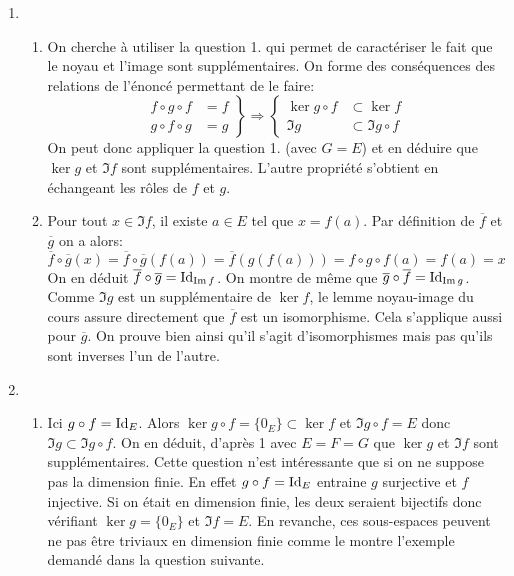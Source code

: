 \begin{enumerate}
 \item
\begin{enumerate}
 \item On cherche à utiliser la question 1. qui permet de caractériser le fait que le noyau et l'image sont supplémentaires. On forme des conséquences des relations de l'énoncé permettant de le faire:
\begin{displaymath}
 \left. 
\begin{aligned}
 f\circ g \circ f &= f \\ g\circ f \circ g &= g 
\end{aligned}
\right\rbrace 
\Rightarrow
\left\lbrace 
\begin{aligned}
 \ker g\circ f &\subset \ker f \\ \Im g &\subset \Im g\circ f
\end{aligned}
\right. 
\end{displaymath}
On peut donc appliquer la question 1. (avec $G=E$) et en déduire que $\ker g$ et $\Im f$ sont supplémentaires.\newline
L'autre propriété s'obtient en échangeant les rôles de $f$ et $g$.
 \item Pour tout $x\in \Im f$, il existe $a\in E$ tel que $x=f(a)$. Par définition de $\overline{f}$ et $\overline{g}$ on a alors:
\begin{displaymath}
 \overline{f}\circ\overline{g}(x) = \overline{f}\circ\overline{g}(f(a))
= \overline{f}(g(f(a))) = f\circ g \circ f (a) = f(a)=x
\end{displaymath}
On en déduit $\overline{f}\circ\overline{g} =\operatorname{Id}_{\operatorname{Im} f}$. On montre de même que $\overline{g}\circ\overline{f} =\operatorname{Id}_{\operatorname{Im} g}$.\newline
Comme $\Im g$ est un supplémentaire de $\ker f$, le lemme noyau-image du cours assure directement que $\overline{f}$ est un isomorphisme. Cela s'applique aussi pour $\overline{g}$. On prouve bien ainsi qu'il s'agit d'isomorphismes mais pas qu'ils sont inverses l'un de l'autre.
\end{enumerate}

 \item
\begin{enumerate}
 \item Ici $g\circ f = \operatorname{Id}_E$. Alors $\ker g\circ f =\{0_E\}\subset \ker f$ et $\Im g\circ f =E$ donc $\Im g \subset \Im g\circ f$. On en déduit, d'après 1 avec $E=F=G$ que $\ker g$ et $\Im f$ sont supplémentaires.\newline
Cette question n'est intéressante que si on ne suppose pas la dimension finie. En effet $g\circ f = \operatorname{Id}_E$ entraine $g$ surjective et $f$ injective. Si on était en dimension finie, les deux seraient bijectifs donc vérifiant $\ker g =\{0_E\}$ et $\Im f = E$.\newline
En revanche, ces sous-espaces peuvent ne pas être triviaux en dimension finie comme le montre l'exemple demandé dans la question suivante.
 

\end{enumerate}
\end{enumerate}
